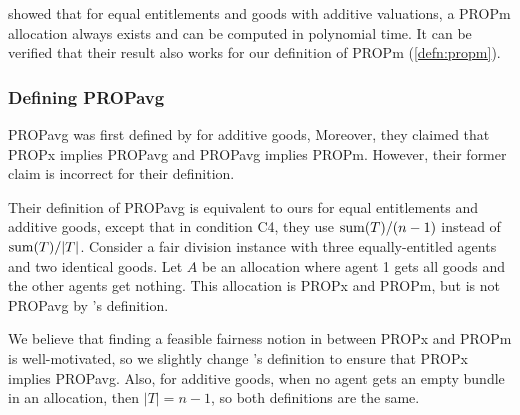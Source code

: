 \citet{baklanov2021propm} showed that for equal entitlements and goods with additive valuations,
a PROPm allocation always exists and can be computed in polynomial time.
It can be verified that their result also works for our definition of PROPm (\cref{defn:propm}).

\subsubsection{Defining PROPavg}
\label{sec:notions:propavg}

PROPavg was first defined by \citet{kobayashi2025proportional} for additive goods,
Moreover, they claimed that PROPx implies PROPavg and PROPavg implies PROPm.
However, their former claim is incorrect for their definition.

Their definition of PROPavg is equivalent to ours for equal entitlements and additive goods,
except that in condition C4, they use $\operatorname{sum}(T)/(n-1)$ instead of $\operatorname{sum}(T)/|T|$.
Consider a fair division instance with three equally-entitled agents and two identical goods.
Let $A$ be an allocation where agent 1 gets all goods and the other agents get nothing.
This allocation is PROPx and PROPm, but is not PROPavg by \citet{kobayashi2025proportional}'s definition.

We believe that finding a feasible fairness notion in between PROPx and PROPm is well-motivated,
so we slightly change \citet{kobayashi2025proportional}'s definition to ensure that PROPx implies PROPavg.
Also, for additive goods, when no agent gets an empty bundle in an allocation,
then $|T| = n-1$, so both definitions are the same.
